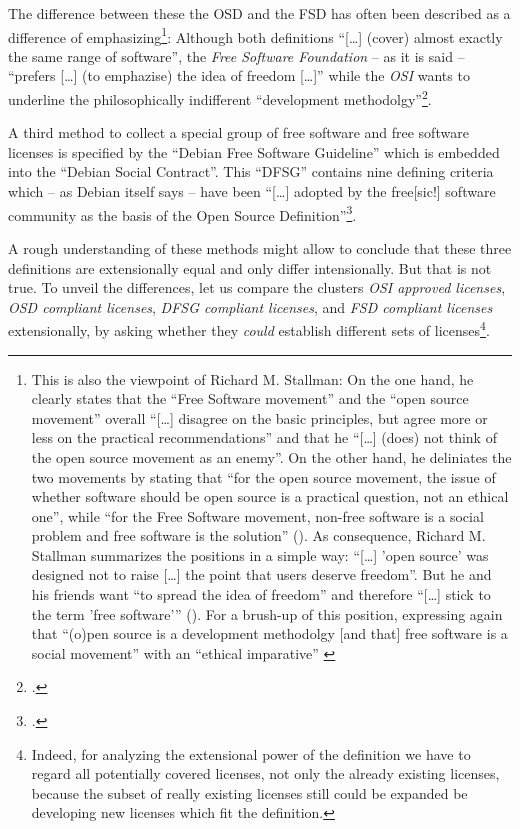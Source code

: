The difference between these the OSD and the FSD has often been described as a
difference of emphasizing\footnote{This is also the viewpoint of Richard M.
Stallman: On the one hand, he clearly states that the \enquote{Free Software
movement} and the \enquote{open source movement} overall \enquote{[\ldots]
disagree on the basic principles, but agree more or less on the practical
recommendations} and that he \enquote{[\ldots] (does) not think of the open
source movement as an enemy}.  On the other hand, he deliniates the two
movements by stating that \enquote{for the open source movement, the issue of
whether software should be open source is a practical question, not an ethical
one}, while \enquote{for the Free Software movement, non-free software is a
social problem and free software is the solution}
(\cite[cf.][55]{Stallman1998a}). \label{RmsFsPriority} As consequence, Richard
M. Stallman summarizes the positions in a simple way: \enquote{[\ldots] 'open
source' was designed not to raise [\ldots] the point that users deserve
freedom}. But he and his friends want \enquote{to spread the idea of freedom}
and therefore \enquote{[\ldots] stick to the term 'free software'}
(\cite[][59]{Stallman1998a}). For a brush-up of this position, expressing
again that \enquote{(o)pen source is a development methodolgy [and that] free
software is a social movement} with an \enquote{ethical imparative}
\cite[cf.][31]{Stallman2009a} }: Although both definitions \enquote{[\ldots]
(cover) almost exactly the same range of software}, the \emph{Free Software
Foundation} -- as it is said -- \enquote{prefers [\ldots] (to emphazise) the
idea of freedom [\ldots]} while the \emph{OSI} wants to underline the
philosophically indifferent \enquote{development methodolgy}\footcite[pars pro
toto: cf.][232]{Fogel2006a}.

A third method to collect a special group of free software and free software
licenses is specified by the \enquote{Debian Free Software Guideline} which is
embedded into the \enquote{Debian Social Contract}. This \enquote{DFSG} contains
nine defining criteria which -- as Debian itself says -- have been
\enquote{[\ldots] adopted by the free[sic!] software community as the basis of
the Open Source Definition}\footcite[cf.][wp]{DFSG2013a}.

A rough understanding of these methods might allow to conclude that these three
definitions are extensionally equal and only differ intensionally.
But that is not true. To unveil the differences, let us compare the clusters
\emph{OSI approved licenses}, \emph{OSD compliant licenses}, \emph{DFSG
compliant licenses}, and \emph{FSD compliant licenses} extensionally, by asking
whether they \emph{could} establish different sets of licenses\footnote{Indeed,
for analyzing the extensional power of the definition we have to regard all
potentially covered licenses, not only the already existing licenses, because
the subset of really existing licenses still could be expanded be developing new
licenses which fit the definition.}.

